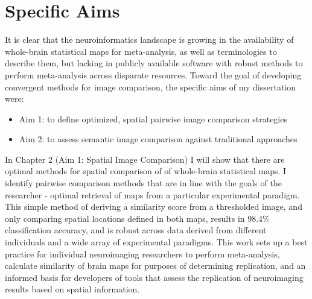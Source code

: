 \documentclass{report}
\begin{document}
\section{Specific Aims}
It is clear that the neuroinformatics landscape is growing in the
availability of whole-brain statistical maps for meta-analysis, as well
as terminologies to describe them, but lacking in publicly available software with robust methods to perform meta-analysis across disparate resources. Toward the goal of
developing convergent methods for image comparison, the specific aims of my dissertation were:

\begin{itemize}
\item
  Aim 1: to define optimized, spatial pairwise image comparison
  strategies
\end{itemize}

\begin{itemize}
\item
  Aim 2: to assess semantic image comparison against traditional
  approaches
\end{itemize}

In Chapter 2 (Aim 1: Spatial Image Comparison) I will show that there
are optimal methods for spatial comparison of of whole-brain statistical
maps. I identify pairwise comparison methods that are in line with the
goals of the researcher - optimal retrieval of maps from a particular
experimental paradigm. This simple method of deriving a similarity score
from a thresholded image, and only comparing spatial locations defined
in both maps, results in 98.4\% classification accuracy, and is robust
across data derived from different individuals and a wide array of
experimental paradigms. This work sets up a best practice for individual
neuroimaging researchers to perform meta-analysis, calculate similarity
of brain maps for purposes of determining replication, and an informed
basis for developers of tools that assess the replication of
neuroimaging results based on spatial information.
\end{document}
